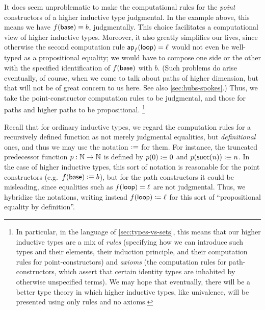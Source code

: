 It does seem unproblematic to make the computational rules for the \emph{point} constructors of a higher inductive type judgmental.
In the example above, this means we have $f(\mathsf{base})\equiv b$, judgmentally.
This choice facilitates a computational view of higher inductive types.
Moreover, it also greatly simplifies our lives, since otherwise the second computation rule $\mathsf{ap}_{f} (\mathsf{loop}) = \ell$ would not even be well-typed as a propositional equality; we would have to compose one side or the other with the specified identification of $f(\mathsf{base})$ with $b$.
(Such problems do arise eventually, of course, when we come to talk about paths of higher dimension, but that will not be of great concern to us here.
See also \autoref{sec:hubs-spokes}.)
Thus, we take the point-constructor computation rules to be judgmental, and those for paths and higher paths to be propositional.%
\footnote{In particular, in the language of \autoref{sec:types-vs-sets}, this means that our higher inductive types are a mix of \emph{rules} (specifying how we can introduce such types and their elements, their induction principle, and their computation rules for point-constructors) and \emph{axioms} (the computation rules for path-constructors, which assert that certain identity types are inhabited by otherwise unspecified terms).
We may hope that eventually, there will be a better type theory in which higher inductive types, like univalence, will be presented using only rules and no axioms.%
%
%
}

\begin{rmk}\label{rmk:defid}
Recall that for ordinary inductive types, we regard the computation rules for a recursively defined function as not merely judgmental equalities, but \emph{definitional} ones, and thus we may use the notation $\vcentcolon\equiv$ for them.
For instance, the truncated predecessor function $p:\mathbb{N}\to\mathbb{N}$ is defined by $p(0)\vcentcolon\equiv 0$ and $p(\mathsf{succ}(n))\vcentcolon\equiv n$.
In the case of higher inductive types, this sort of notation is reasonable for the point constructors (e.g.\ $f(\mathsf{base})\vcentcolon\equiv b$), but for the path constructors it could be misleading, since equalities such as ${f}\mathopen{}\left({\mathsf{loop}}\right)\mathclose{} = \ell$ are not judgmental.
Thus, we hybridize the notations, writing instead ${f}\mathopen{}\left({\mathsf{loop}}\right)\mathclose{} \coloneqq \ell$ for this sort of ``propositional equality by definition''.
\end{rmk}

